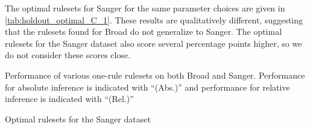 The optimal rulesets for Sanger for the same parameter choices are given in \autoref{tab:holdout_optimal_C_1}.
These results are qualitatively different, suggesting that the rulesets found for Broad do not generalize to Sanger.
The optimal rulesets for the Sanger dataset also score several percentage points higher, so we do not consider these scores close.

\begin{adjustwidth}{-3cm}{-3cm}
    \begin{table}
        \caption{Performance of various one-rule rulesets on both Broad and Sanger.
        Performance for absolute inference is indicated  with ``(Abs.)''
            and performance for relative inference is indicated with ``(Rel.)''}
        \label{tab:holdout_C_1}
    \end{table}
\end{adjustwidth}

\begin{adjustwidth}{-3cm}{-3cm}
    \begin{table}
        \caption{Optimal rulesets for the Sanger dataset}
        \label{tab:holdout_optimal_C_1}
    \end{table}
\end{adjustwidth}